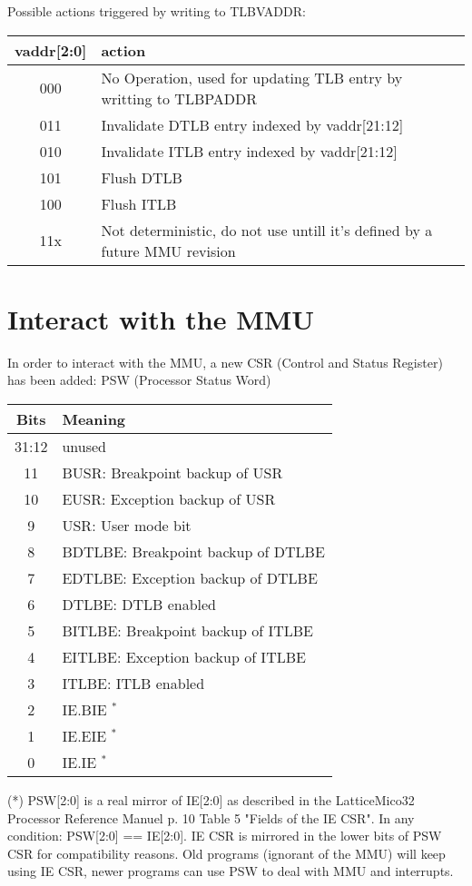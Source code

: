 \documentclass[a4paper,11pt]{article}
\begin{document}
Possible actions triggered by writing to TLBVADDR:

\begin{tabular}{|c|l|}
\hline
\bf{vaddr[2:0]} & \bf{action} \\
\hline
000 & No Operation, used for updating TLB entry by writting to TLBPADDR \\
\hline
011 & Invalidate DTLB entry indexed by vaddr[21:12] \\
\hline
010 & Invalidate ITLB entry indexed by vaddr[21:12] \\
\hline
101 & Flush DTLB \\
\hline
100 & Flush ITLB \\
\hline
11x & Not deterministic, do not use untill it's defined by a future MMU revision \\
\hline
\end{tabular}

\section{Interact with the MMU}

In order to interact with the MMU, a new CSR (Control and Status Register) has been added: PSW (Processor Status Word)

\begin{tabular}{|c|l|}
\hline
\bf{Bits} & \bf{Meaning} \\
\hline
31:12 & unused \\
\hline
11 & BUSR: Breakpoint backup of USR\\
\hline
10 & EUSR: Exception backup of USR\\
\hline
9 & USR: User mode bit\\
\hline
8 & BDTLBE: Breakpoint backup of DTLBE \\
\hline
7 & EDTLBE: Exception backup of DTLBE \\
\hline
6 & DTLBE: DTLB enabled \\
\hline
5 & BITLBE: Breakpoint backup of ITLBE \\
\hline
4 & EITLBE: Exception backup of ITLBE \\
\hline
3 & ITLBE: ITLB enabled \\
\hline
2 & IE.BIE $^{*}$ \\
\hline
1 & IE.EIE $^{*}$ \\
\hline
0 & IE.IE $^{*}$ \\
\hline
\end{tabular}

(*) PSW[2:0] is a real mirror of IE[2:0] as described in the LatticeMico32 Processor Reference Manuel p. 10 Table 5 "Fields of the IE CSR". In any condition: PSW[2:0] == IE[2:0]. IE CSR is mirrored in the lower bits of PSW CSR for compatibility reasons. Old programs (ignorant of the MMU) will keep using IE CSR, newer programs can use PSW to deal with MMU and interrupts.
\end{document}
